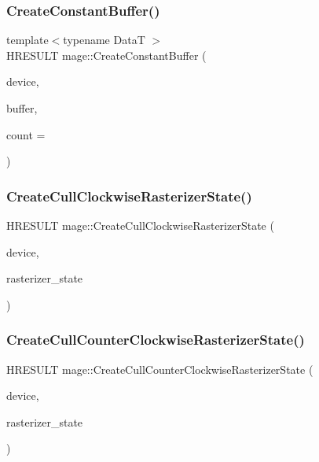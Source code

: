 \subsubsection{\texorpdfstring{Create\+Constant\+Buffer()}{CreateConstantBuffer()}}
{\footnotesize\ttfamily template$<$typename DataT $>$ \\
H\+R\+E\+S\+U\+LT mage\+::\+Create\+Constant\+Buffer (\begin{DoxyParamCaption}\item[{I\+D3\+D11\+Device2 $\ast$}]{device,  }\item[{I\+D3\+D11\+Buffer $\ast$$\ast$}]{buffer,  }\item[{size\+\_\+t}]{count = {} }\end{DoxyParamCaption})}

\hypertarget{namespacemage_a033a0ae29692c9fc223e532b7487aed5}{}\label{namespacemage_a033a0ae29692c9fc223e532b7487aed5} 
\subsubsection{\texorpdfstring{Create\+Cull\+Clockwise\+Rasterizer\+State()}{CreateCullClockwiseRasterizerState()}}
{\footnotesize\ttfamily H\+R\+E\+S\+U\+LT mage\+::\+Create\+Cull\+Clockwise\+Rasterizer\+State (\begin{DoxyParamCaption}\item[{I\+D3\+D11\+Device2 $\ast$}]{device,  }\item[{I\+D3\+D11\+Rasterizer\+State $\ast$$\ast$}]{rasterizer\+\_\+state }\end{DoxyParamCaption})}

\hypertarget{namespacemage_a9d5863bf2519cdac7a59c39dec10b938}{}\label{namespacemage_a9d5863bf2519cdac7a59c39dec10b938} 
\subsubsection{\texorpdfstring{Create\+Cull\+Counter\+Clockwise\+Rasterizer\+State()}{CreateCullCounterClockwiseRasterizerState()}}
{\footnotesize\ttfamily H\+R\+E\+S\+U\+LT mage\+::\+Create\+Cull\+Counter\+Clockwise\+Rasterizer\+State (\begin{DoxyParamCaption}\item[{I\+D3\+D11\+Device2 $\ast$}]{device,  }\item[{I\+D3\+D11\+Rasterizer\+State $\ast$$\ast$}]{rasterizer\+\_\+state }\end{DoxyParamCaption})}

